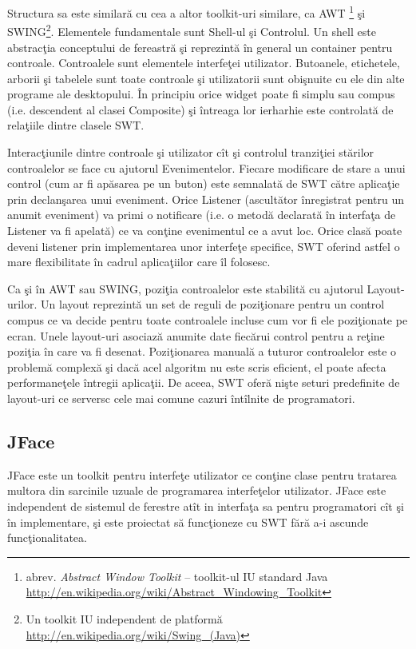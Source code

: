 Structura sa este similară cu cea a altor toolkit-uri similare, ca AWT 
\footnote{abrev. \textit{Abstract Window Toolkit} -- toolkit-ul IU standard 
Java \url{http://en.wikipedia.org/wiki/Abstract_Windowing_Toolkit}} şi 
SWING\footnote{Un toolkit IU independent de platformă 
\url{http://en.wikipedia.org/wiki/Swing_(Java)}}. Elementele fundamentale sunt 
Shell-ul şi Controlul. Un shell este abstracţia conceptului de fereastră şi 
reprezintă în general un container pentru controale. Controalele sunt 
elementele interfeţei utilizator. Butoanele, etichetele, arborii şi tabelele 
sunt toate controale şi utilizatorii sunt obişnuite cu ele din alte programe 
ale desktopului. \cite{swt} În principiu orice widget poate fi simplu sau 
compus (i.e. descendent al clasei Composite) şi întreaga lor ierharhie este 
controlată de relaţiile dintre clasele SWT.

Interacţiunile dintre controale şi utilizator cît şi controlul tranziţiei 
stărilor controalelor se face cu ajutorul Evenimentelor. Fiecare modificare de 
stare a unui control (cum ar fi apăsarea pe un buton) este semnalată de SWT 
către aplicaţie prin declanşarea unui eveniment. Orice Listener (ascultător 
înregistrat pentru un anumit eveniment) va primi o notificare (i.e. o metodă 
declarată în interfaţa de Listener va fi apelată) ce va conţine evenimentul ce 
a avut loc. Orice clasă poate deveni listener prin implementarea unor interfeţe 
specifice, SWT oferind astfel o mare flexibilitate în cadrul aplicaţiilor care 
îl folosesc.

Ca şi în AWT sau SWING, poziţia controalelor este stabilită cu ajutorul 
Layout-urilor. Un layout reprezintă un set de reguli de poziţionare pentru un 
control compus ce va decide pentru toate controalele incluse cum vor fi ele 
poziţionate pe ecran. Unele layout-uri asociază anumite date fiecărui control 
pentru a reţine poziţia în care va fi desenat. Poziţionarea manuală a tuturor 
controalelor este o problemă complexă şi dacă acel algoritm nu este scris 
eficient, el poate afecta performaneţele întregii aplicaţii. De aceea, SWT 
oferă nişte seturi predefinite de layout-uri ce serversc cele mai comune cazuri 
întîlnite de programatori.

\subsection{JFace}
JFace este un toolkit pentru interfeţe utilizator ce conţine clase pentru 
tratarea multora din sarcinile uzuale de programarea interfeţelor utilizator. 
JFace este independent de sistemul de ferestre atît in interfaţa sa pentru 
programatori cît şi în implementare, şi este proiectat să funcţioneze cu SWT 
fără a-i ascunde funcţionalitatea.

